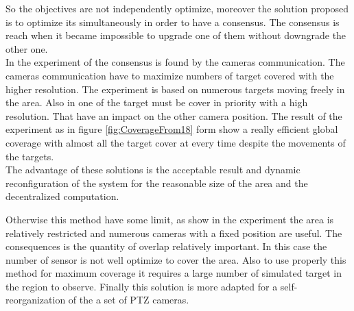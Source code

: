 So the objectives are not independently optimize, moreover the solution proposed is to optimize its  simultaneously in order to have a consensus. The consensus is reach when it became impossible to upgrade one of them without downgrade the other one.\\
  In the experiment of \cite{18*ding2012,25*song2008} the consensus is found by the cameras communication. The cameras communication have to maximize numbers of  target covered with the higher resolution.
 The experiment is based on numerous targets moving freely in the area. Also in \cite{18*ding2012} one of the target must be cover in priority with a high resolution. That have an impact on the other camera position.
 The result of the experiment as in figure \ref{fig:CoverageFrom18} form \cite{18*ding2012} show a really efficient global coverage with almost all the target cover at every time despite the movements of the targets. \\
 The advantage of these solutions is the acceptable result and dynamic reconfiguration of the system for the reasonable size of the area and the decentralized computation.
 
Otherwise this method have some limit, as show in the experiment the area is relatively restricted and numerous cameras with a fixed position are useful. The consequences is the quantity of overlap relatively important. In this case the number of sensor is not well optimize to cover the area. Also to use properly this method for maximum coverage it requires a large number of simulated target in the region to observe.  Finally this solution is more adapted for a self-reorganization of the a set of PTZ cameras.

